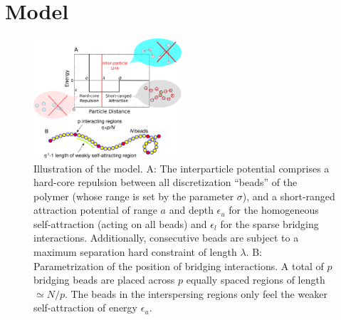 \documentclass[
preprint,
a4paper,
12pt,
superscriptaddress,
pre]{revtex4}
\begin{document}
\section{Model}

\begin{figure}
  \centering
 \includegraphics[width=0.49\textwidth]{fig1}
 \caption{Illustration of the model. A: The interparticle potential
   comprises a hard-core repulsion between all discretization
   ``beads'' of the polymer (whose range is set by the parameter
   $\sigma$), and a short-ranged attraction potential of range
   $a$ and depth $\epsilon_u$ for the homogeneous self-attraction
   (acting on all beads) and $\epsilon_l$ for the sparse bridging
   interactions. Additionally, consecutive beads are subject to a
   maximum separation hard constraint of length $\lambda$.
   B: Parametrization of the position of bridging interactions. A
   total of $p$ bridging beads are placed across $p$ equally spaced
   regions of length $\simeq N /p$. The beads in the interspersing
   regions only feel the weaker self-attraction of energy
   $\epsilon_u$. }
  \label{fig:1}
\end{figure}
\end{document}

